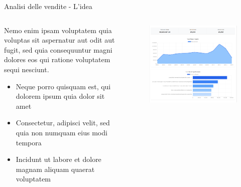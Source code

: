 \documentclass{beamer}
\begin{document}
	\begin{frame}{Analisi delle vendite - L'idea}
		\begin{columns}
			\begin{column}{0.6\textwidth}
				Nemo enim ipsam voluptatem quia voluptas sit aspernatur aut odit aut fugit, sed quia consequuntur magni dolores eos qui ratione voluptatem sequi nesciunt.

				\begin{itemize}
					\item Neque porro quisquam est, qui dolorem ipsum quia dolor sit amet
					\item Consectetur, adipisci velit, sed quia non numquam eius modi tempora
					\item Incidunt ut labore et dolore magnam aliquam quaerat voluptatem
				\end{itemize}
			\end{column}
			\begin{column}{0.4\textwidth}
				\begin{figure}
					\centering
					\includegraphics[width=\textwidth]{Oribea - Esempio di report delle vendite.png}
				\end{figure}
			\end{column}
		\end{columns}
	\end{frame}
\end{document}
